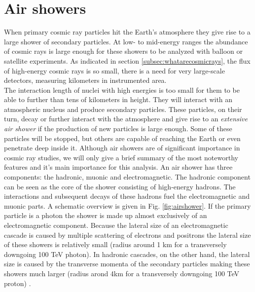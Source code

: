 \section{Air showers}
\label{sec:airshowers}
When primary cosmic ray particles hit the Earth's atmosphere they give rise to a large shower of secondary particles. At low- to mid-energy ranges the abundance of cosmic rays is large enough for these showers to be analyzed with balloon or satellite experiments. As indicated in section \ref{subsec:whatarecosmicrays}, the flux of high-energy cosmic rays is so small, there is a need for very large-scale detectors, measuring kilometers in instrumented area.\\
\newline
The interaction length of nuclei with high energies is too small for them to be able to further than tens of kilometers in height. They will interact with an atmospheric nucleus and produce secondary particles. These particles, on their turn, decay or further interact with the atmosphere and give rise to an \textit{extensive air shower} if the production of new particles is large enough. Some of these particles will be stopped, but others are capable of reaching the Earth or even penetrate deep inside it. Although air showers are of significant importance in cosmic ray studies, we will only give a brief summary of the most noteworthy features and it's main importance for this analysis.
An air shower has three components: the hadronic, muonic and electromagnetic. The hadronic component can be seen as the core of the shower consisting of high-energy hadrons. The interactions and subsequent decays of these hadrons fuel the electromagnetic and muonic parts. A schematic overview is given in Fig. \ref{fig:airshower}. If the primary particle is a photon the shower is made up almost exclusively of an electromagnetic component. Because the lateral size of an electromagnetic cascade is caused by multiple scattering of electrons and positrons the lateral size of these showers is relatively small (radius around 1 km for a transversely downgoing 100 TeV photon). In hadronic cascades, on the other hand, the lateral size is caused by the transverse momenta of the secondary particles making these showers much larger (radius arond 4km for a transversely downgoing 100 TeV proton) \cite{Grupen:2005rx}.


